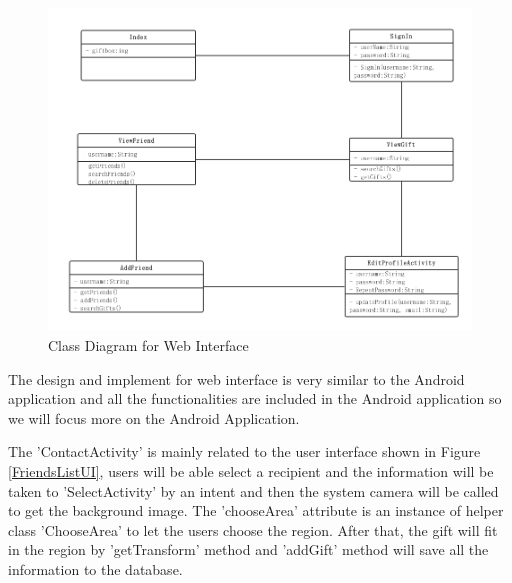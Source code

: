 \begin{figure}[htb]
\centering
\includegraphics[width=.9\textwidth]{section03/assets/WebClassDiagram.png}
\caption[Class Diagram for Web Interface]{\label{WebClassDiagram}Class Diagram for Web Interface}
\end{figure}
\par The design and implement for web interface is very similar to the Android application and all the functionalities are included in the Android application so we will focus more on the Android Application.
\par The 'ContactActivity' is mainly related to the user interface shown in Figure \ref{FriendsListUI}, users will be able select a recipient and the information will be taken to 'SelectActivity' by an intent and then the system camera will be called to get the background image. The 'chooseArea' attribute is an instance of helper class 'ChooseArea' to let the users choose the region. After that, the gift will fit in the region by 'getTransform' method and 'addGift' method will save all the information to the database.
